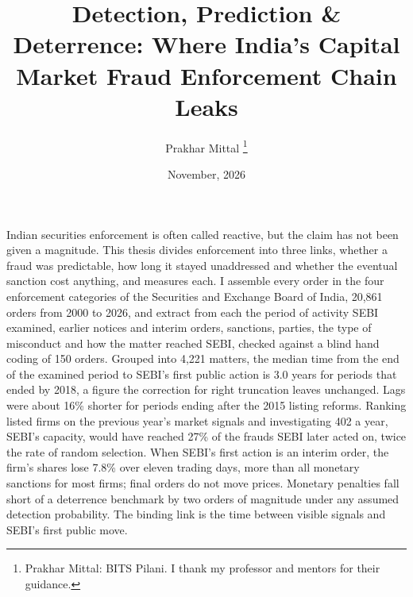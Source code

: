 \documentclass[letterpaper,11pt,leqno]{article}
\begin{document}
\title{Detection, Prediction \& Deterrence: Where India's Capital Market Fraud Enforcement Chain Leaks}

\author{Prakhar Mittal
%
\thanks{Prakhar Mittal: BITS Pilani. I thank my professor and mentors for their guidance.}}

\date{November, 2026}


\begin{titlepage}
\maketitle

Indian securities enforcement is often called reactive, but the claim has not been given a magnitude. This thesis divides enforcement into three links, whether a fraud was predictable, how long it stayed unaddressed and whether the eventual sanction cost anything, and measures each. I assemble every order in the four enforcement categories of the Securities and Exchange Board of India, 20,861 orders from 2000 to 2026, and extract from each the period of activity SEBI examined, earlier notices and interim orders, sanctions, parties, the type of misconduct and how the matter reached SEBI, checked against a blind hand coding of 150 orders. Grouped into 4,221 matters, the median time from the end of the examined period to SEBI's first public action is 3.0 years for periods that ended by 2018, a figure the correction for right truncation leaves unchanged. Lags were about 16\% shorter for periods ending after the 2015 listing reforms. Ranking listed firms on the previous year's market signals and investigating 402 a year, SEBI's capacity, would have reached 27\% of the frauds SEBI later acted on, twice the rate of random selection. When SEBI's first action is an interim order, the firm's shares lose 7.8\% over eleven trading days, more than all monetary sanctions for most firms; final orders do not move prices. Monetary penalties fall short of a deterrence benchmark by two orders of magnitude under any assumed detection probability. The binding link is the time between visible signals and SEBI's first public move.
\end{titlepage}

\setcounter{tocdepth}{2}
\begingroup\small\singlespacing
\tableofcontents
\endgroup
\clearpage
\end{document}
